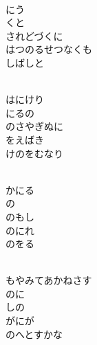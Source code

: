 \documentclass[10pt,b5j]{tarticle} %
\begin{document}
\vspace{1.5em} %
\newcommand{\linespace}{0.5em} %
\newcommand{\blocksize}{0.5\hsize} %
\newcommand{\itemmargin}{6em} %
\begin{enumerate} %
    \setlength{\itemindent}{\itemmargin} %
    \begin{minipage}[c]{\blocksize}
    
        \vspace{\linespace}
        \item~\\
        にう\\
        くと\\
        されどづくに\\
        はつのるせつなくも\\
        しばしと
        
        \vspace{\linespace}
        \item~\\
        はにけり\\
        にるの\\
        のさやぎぬに\\
        をえばき\\
        けのをむなり
        
        \vspace{\linespace}
        \item~\\
        かにる\\
        の\\
        のもし\\
        のにれ\\
        のをる
        
        \vspace{\linespace}
        \item~\\
        もやみてあかねさす\\
        のに\\
        しの\\
        がにが\\
        のへとすかな
        

\end{minipage}
\end{enumerate}
\end{document}

